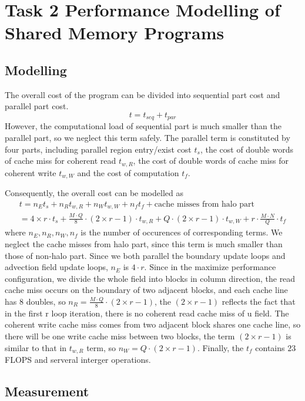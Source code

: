 \section{Task 2 Performance Modelling of Shared Memory Programs}

\subsection{Modelling}
The overall cost of the program can be divided into sequential part cost and parallel part cost.
\[
	t = t_{seq} + t_{par}
\]
However, the computational load of sequential part is much smaller than the parallel part,
so we neglect this term safely. 
The parallel term is constituted by four parts, including parallel region entry/exist cost $t_s$,
the cost of double words of cache miss for coherent read $t_{w,R}$,
the cost of double words of cache miss for coherent write $t_{w,W}$
and the cost of computation $t_f$.

Consequently, the overall cost can be modelled as 
\begin{eqnarray*}
	t = n_E t_s + n_R t_{w,R} + n_W t_{w,W} + n_f t_f + \textrm{cache misses from halo part} \\
	 = 4\times r \cdot t_s + \frac{M\cdot Q}{8}\cdot (2 \times r - 1)  \cdot t_{w,R} + Q \cdot (2 \times r -1 ) \cdot t_{w,W} + r\cdot \frac{M\cdot N}{Q} \cdot t_f
 \end{eqnarray*}
where $n_E, n_R, n_W, n_f$ is the number of occurences of corresponding terms.
We neglect the cache misses from halo part, since this term is much smaller than those of non-halo part.
Since we both parallel the boundary update loops and advection field update loops,
$n_E$ is $4\cdot r$.
Since in the maximize performance configuration, we divide the whole field into blocks in column direction,
the read cache miss occurs on the boundary of two adjacent blocks,
and each cache line has $8$ doubles, so $n_R = \frac{M\cdot Q}{8}\cdot (2 \times r - 1)$,
the $( 2 \times r - 1)$ reflects the fact that in the first r loop iteration, there is no coherent
read cache miss of u field. The coherent write cache miss comes from two adjacent block shares 
one cache line, so there will be one write cache miss between two blocks, the term $(2\times r-1)$
is similar to that in $t_{w,R}$ term, so $n_W = Q \cdot (2 \times r -1 )$. Finally, the $t_f$ contains
$23$ FLOPS and serveral interger operations.

\subsection{Measurement}
 
